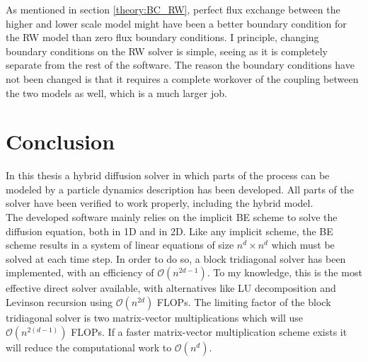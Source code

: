 As mentioned in section \ref{theory:BC_RW}, perfect flux exchange between the higher and lower scale model might have been a better boundary condition for the RW model than zero flux boundary conditions. 
I principle, changing boundary conditions on the RW solver is simple, seeing as it is completely separate from the rest of the software. 
The reason the boundary conditions have not been changed is that it requires a complete workover of the coupling between the two models as well, which is a much larger job. 



\section{Conclusion}

In this thesis a hybrid diffusion solver in which parts of the process can be modeled by a particle dynamics description has been developed. 
All parts of the solver have been verified to work properly, including the hybrid model. \\


The developed software mainly relies on the implicit BE scheme to solve the diffusion equation, both in 1D and in 2D. 
Like any implicit scheme, the BE scheme results in a system of linear equations of size $n^d\times n^d$ which must be solved at each time step. 
In order to do so, a block tridiagonal solver has been implemented, with an efficiency of $\mathcal{O}(n^{2d-1})$. 
To my knowledge, this is the most effective direct solver available, with alternatives like LU decomposition and Levinson recursion using $\mathcal{O}(n^{2d})$ FLOPs. 
The limiting factor of the block tridiagonal solver is two matrix-vector multiplications which will use $\mathcal{O}(n^{2(d-1)})$ FLOPs. 
If a faster matrix-vector multiplication scheme exists it will reduce the computational work to $\mathcal{O}(n^d)$. \\

